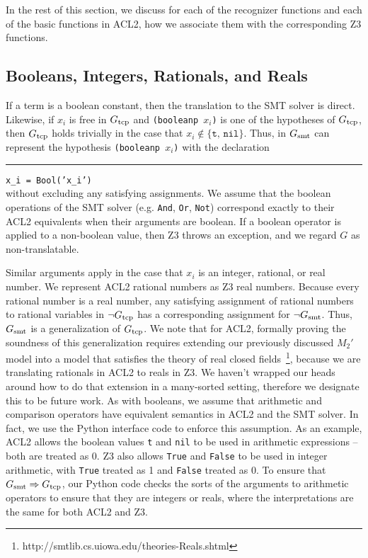 In the rest of this section, we discuss for each of the recognizer functions and
each of the basic functions in ACL2, how we associate them with the
corresponding Z3 functions.


\subsection{Booleans, Integers, Rationals, and Reals}\label{sec:reals}
If a term is a boolean constant, then the translation to the SMT solver is direct.
Likewise, if $x_i$ is free in $G_{\mathrm{tcp}}$ and \texttt{(booleanp $x_i$)}
is one of the hypotheses of $G_{\mathrm{tcp}}$, then $G_{\mathrm{tcp}}$ holds trivially in the case that
$x_i \not\in \{\texttt{t},\,\texttt{nil}\}$.  Thus, in $G_{\mathrm{smt}}$ \smtlink{} can
represent the hypothesis \texttt{(booleanp $x_i$)} with the declaration\\
\rule{2em}{0ex}\texttt{x\_i = Bool('x\_i')}\\
without excluding any satisfying assignments.  We assume that the boolean operations
of the SMT solver (e.g. \texttt{And}, \texttt{Or}, \texttt{Not}) correspond
exactly to their ACL2 equivalents when their arguments are boolean.  If a boolean
operator is applied to a non-boolean value, then Z3 throws an exception, and we
regard $G$ as non-translatable.

Similar arguments apply in the case that $x_i$ is an integer, rational, or real
number. We represent ACL2 rational numbers as Z3 real numbers. Because every
rational number is a real number, any satisfying assignment of rational numbers
to rational variables in $\neg G_{\mathrm{tcp}}$ has a corresponding assignment for $\neg
G_{\mathrm{smt}}$. Thus, $G_{\mathrm{smt}}$ is a generalization of $G_{\mathrm{tcp}}$.
We note that for ACL2, formally proving the soundness of this generalization
requires extending our previously discussed $M_2'$ model into a model that
satisfies the theory of real closed
fields~\footnote{http://smtlib.cs.uiowa.edu/theories-Reals.shtml}, because we
are translating rationals in ACL2 to reals in Z3. We haven't wrapped our heads
around how to do that extension in a many-sorted setting, therefore we designate
this to be future work. As with booleans, we assume that arithmetic and
comparison operators have equivalent semantics in ACL2 and the 
SMT solver. In fact, we use the Python interface code to enforce this
assumption. As an example, ACL2 allows the boolean values \texttt{t} and
\texttt{nil} to be used in arithmetic expressions -- both are treated as 0.
Z3 also allows \texttt{True} and \texttt{False} to be used in integer
arithmetic, with \texttt{True} treated as 1 and \texttt{False} treated as 0.
To ensure that $G_{\mathrm{smt}} \Rightarrow G_{\mathrm{tcp}}$, our Python code checks the sorts of the
arguments to arithmetic operators to ensure that they are integers or reals, where
the interpretations are the same for both ACL2 and Z3.

